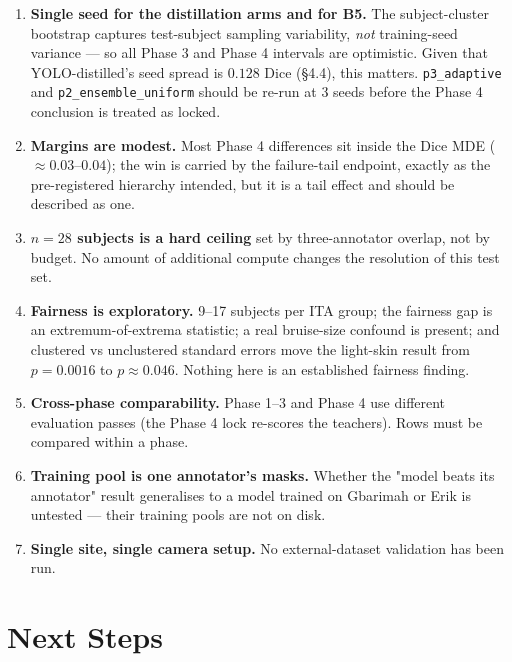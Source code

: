 \documentclass[11pt]{article}
\begin{document}
\begin{enumerate}[leftmargin=1.6em,itemsep=3pt]
  \item \textbf{Single seed for the distillation arms and for B5.} The subject-cluster bootstrap
  captures test-subject sampling variability, \emph{not} training-seed variance --- so all Phase 3
  and Phase 4 intervals are optimistic. Given that YOLO-distilled's seed spread is $0.128$ Dice
  (\S4.4), this matters. \texttt{p3\_adaptive} and \texttt{p2\_ensemble\_uniform} should be re-run
  at 3 seeds before the Phase 4 conclusion is treated as locked.
  \item \textbf{Margins are modest.} Most Phase 4 differences sit inside the Dice MDE
  ($\approx0.03$--$0.04$); the win is carried by the failure-tail endpoint, exactly as the
  pre-registered hierarchy intended, but it is a tail effect and should be described as one.
  \item \textbf{$n=28$ subjects is a hard ceiling} set by three-annotator overlap, not by budget.
  No amount of additional compute changes the resolution of this test set.
  \item \textbf{Fairness is exploratory.} 9--17 subjects per ITA group; the fairness gap is an
  extremum-of-extrema statistic; a real bruise-size confound is present; and clustered vs
  unclustered standard errors move the light-skin result from $p=0.0016$ to $p\approx0.046$.
  Nothing here is an established fairness finding.
  \item \textbf{Cross-phase comparability.} Phase 1--3 and Phase 4 use different evaluation
  passes (the Phase 4 lock re-scores the teachers). Rows must be compared within a phase.
  \item \textbf{Training pool is one annotator's masks.} Whether the "model beats its annotator"
  result generalises to a model trained on Gbarimah or Erik is untested --- their training pools
  are not on disk.
  \item \textbf{Single site, single camera setup.} No external-dataset validation has been run.
\end{enumerate}

\section{Next Steps}
\end{document}
